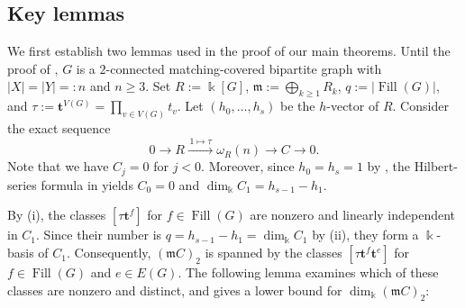 \documentclass[a4paper,reqno,11pt]{amsart}
\theoremstyle{definition}
\theoremstyle{remark}
\numberwithin{equation}{section}
\newcommand{\kk}{\Bbbk}
\newcommand{\tb}{\mathbf t}
\newcommand{\frakm}{\mathfrak m}
\newcommand{\Fill}{\operatorname{Fill}}
\begin{document}
\subsection{Key lemmas}\label{subsec:lemmas}
We first establish two lemmas used in the proof of our main theorems.
Until the proof of , $G$ is a $2$-connected matching-covered bipartite graph with $|X|=|Y|=:n$ and $n\ge3$.
Set $R:=\kk[G]$, $\frakm:=\bigoplus_{k\ge 1} R_k$, $q:=|\Fill(G)|$, and $\tau:=\tb^{V(G)}=\prod_{v\in V(G)}t_v$.
Let $(h_0,\ldots,h_s)$ be the $h$-vector of $R$.
Consider the exact sequence
\begin{equation}\label{eq:monomial-sequence}
    0\longrightarrow R\xrightarrow{\,1\mapsto\tau\,}\omega_R(n)\longrightarrow C\longrightarrow0.
\end{equation}
Note that we have $C_j=0$ for $j<0$.
Moreover, since $h_0=h_s=1$ by , the Hilbert-series formula in
 yields
$C_0=0$ and $\dim_\kk C_1=h_{s-1}-h_1$.

By  (i), the classes
$[\tau\tb^f]$ for $f\in\Fill(G)$
are nonzero and linearly independent in $C_1$.
Since their number is $q=h_{s-1}-h_1=\dim_\kk C_1$
by  (ii),
they form a $\kk$-basis of $C_1$.
Consequently, $(\frakm C)_2$ is spanned by the classes
$[\tau\tb^f\tb^e]$ for $f\in\Fill(G)$ and $e\in E(G)$.
The following lemma examines which of these classes
are nonzero and distinct, and gives a lower bound
for $\dim_\kk(\frakm C)_2$:
\end{document}
